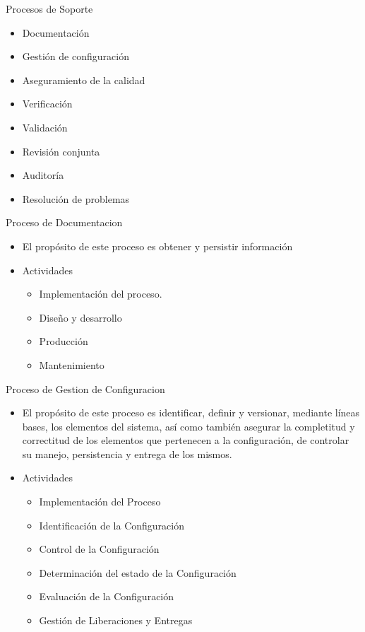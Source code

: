\documentclass{beamer}
\begin{document}
			\begin{frame}{Procesos de Soporte}
			\begin{itemize}
			\item Documentación
			\item Gestión de configuración
			\item Aseguramiento de la calidad
			\item Verificación
			\item Validación
			\item Revisión conjunta
			\item Auditoría
			\item Resolución de problemas
			\end{itemize}
			\end{frame}
			
			\begin{frame}{Proceso de Documentacion}
			\begin{itemize}
			\item El propósito de este proceso es obtener y persistir información
			\item Actividades
			\begin{itemize}
			\item Implementación del proceso.
			\item Diseño y desarrollo
			\item Producción
			\item Mantenimiento
			\end{itemize}
			\end{itemize} 

			\end{frame}
			
			\begin{frame}{Proceso de Gestion de Configuracion}
				\begin{itemize}
					\item El propósito de este proceso es identificar, definir y versionar, mediante líneas bases, los elementos del sistema, así como también asegurar la completitud y correctitud de los elementos que pertenecen a la configuración, de controlar su manejo, persistencia y entrega de los mismos.
					\item Actividades
			
					\begin{itemize}
						\item Implementación del Proceso
						\item Identificación de la Configuración
						\item Control de la Configuración
						\item Determinación del estado de la Configuración
						\item Evaluación de la Configuración
						\item Gestión de Liberaciones y Entregas
					\end{itemize}
			
				\end{itemize}
			
			\end{frame}
			
\end{document}
